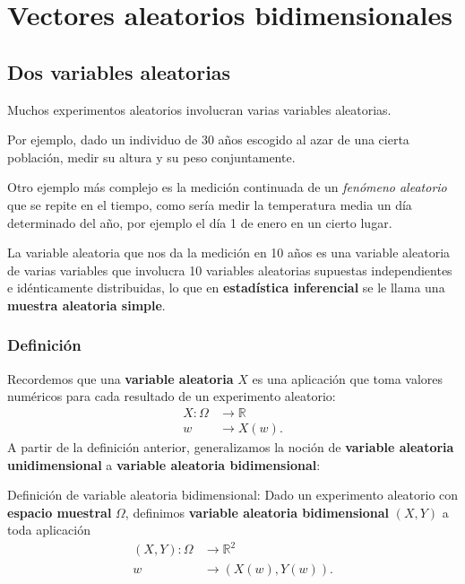 \documentclass[]{book}
\begin{document}
\hypertarget{vectores-aleatorios-bidimensionales}{%
\chapter{Vectores aleatorios bidimensionales}\label{vectores-aleatorios-bidimensionales}}

\hypertarget{dos-variables-aleatorias}{%
\section{Dos variables aleatorias}\label{dos-variables-aleatorias}}

Muchos experimentos aleatorios involucran varias variables aleatorias.

Por ejemplo, dado un individuo de 30 años escogido al azar de una cierta población, medir su altura y su peso conjuntamente.

Otro ejemplo más complejo es la medición continuada de un \emph{fenómeno aleatorio} que se repite en el tiempo, como sería medir la temperatura media un día determinado del año, por ejemplo el día 1 de enero en un cierto lugar.

La variable aleatoria que nos da la medición en 10 años es una variable aleatoria de varias variables que involucra 10 variables aleatorias supuestas independientes e idénticamente distribuidas, lo que en \textbf{estadística inferencial} se le llama una \textbf{muestra aleatoria simple}.

\hypertarget{definiciuxf3n}{%
\subsection{Definición}\label{definiciuxf3n}}

Recordemos que una \textbf{variable aleatoria} \(X\) es una aplicación que toma valores numéricos para cada resultado de un experimento aleatorio:
\[
\begin{array}{rl}
X: \Omega & \longrightarrow \mathbb{R}\\
w & \longrightarrow X(w).
\end{array}
\]
A partir de la definición anterior, generalizamos la noción de \textbf{variable aleatoria unidimensional} a \textbf{variable aleatoria bidimensional}:

Definición de variable aleatoria bidimensional:
Dado un experimento aleatorio con \textbf{espacio muestral} \(\Omega\), definimos \textbf{variable aleatoria bidimensional} \((X,Y)\) a toda aplicación
\[
\begin{array}{rl}
(X,Y): \Omega & \longrightarrow \mathbb{R}^2\\
w & \longrightarrow (X(w),Y(w)).
\end{array}
\]
\end{document}
